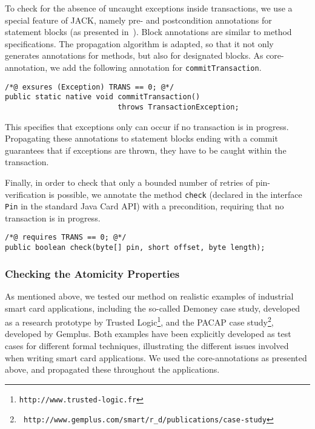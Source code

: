 To check for the absence of uncaught exceptions inside transactions,
we use a special feature of JACK, namely pre- and postcondition
annotations for statement blocks (as presented
in~\cite{BRL-JACK}). Block annotations are  similar to method
specifications. The propagation algorithm is adapted, so that it not
only generates annotations for methods, but also for designated
blocks. As core-annotation, we add the following annotation for
\texttt{commitTransaction}. 
\begin{verbatim}
/*@ exsures (Exception) TRANS == 0; @*/
public static native void commitTransaction() 
                          throws TransactionException;
\end{verbatim}
This specifies that exceptions only can occur if no transaction is in
progress. Propagating these annotations to statement blocks ending
with a commit guarantees that if exceptions are thrown, they have to
be caught within the transaction.



Finally, in order to check that only a bounded number of retries of
pin-verification is possible, we annotate the method \texttt{check}
(declared in the interface \texttt{Pin} in the
standard Java Card API) with a precondition, requiring that no
transaction is in progress.
\begin{verbatim}
/*@ requires TRANS == 0; @*/
public boolean check(byte[] pin, short offset, byte length);
\end{verbatim}

\subsubsection{Checking the Atomicity Properties}


As mentioned above, we tested our method on realistic examples of
industrial smart card applications, including the so-called Demoney
case study, developed as a research prototype by Trusted
Logic\footnote{{\tt http://www.trusted-logic.fr}}, and the PACAP case
study\footnote{{\tt
http://www.gemplus.com/smart/r\_d/publications/case-study}}, developed
by Gemplus. Both examples have been explicitly developed as test cases
for different formal techniques, illustrating the different issues
involved when writing smart card applications. We used the
core-annotations as presented above, and propagated these throughout
the applications.

